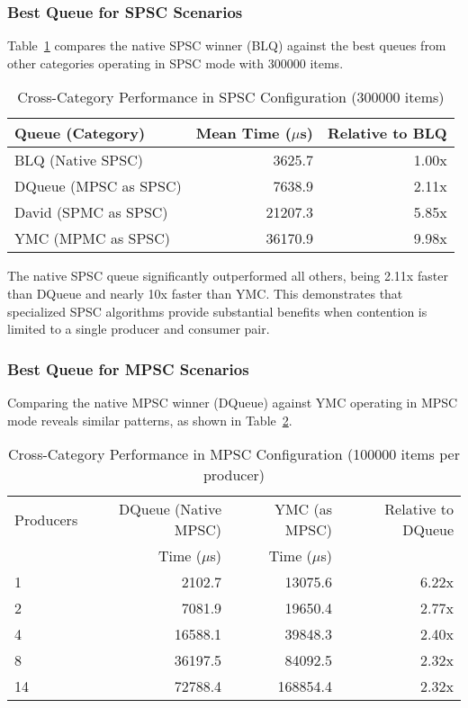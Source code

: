 \subsubsection{Best Queue for \ac{SPSC} Scenarios}
Table~\ref{tab:best-spsc} compares the native \ac{SPSC} winner (\ac{BLQ}) against the best queues from other categories operating in \ac{SPSC} mode with 300000 items.

\begin{table}[htb]
\centering
\caption{Cross-Category Performance in \ac{SPSC} Configuration (300000 items)}
\label{tab:best-spsc}
\begin{tabular}{@{}lrr@{}}
\toprule
Queue (Category) & Mean Time ($\mu$s) & Relative to \ac{BLQ} \\
\midrule
\ac{BLQ} (Native SPSC) & 3625.7 & 1.00x \\
DQueue (MPSC as SPSC) & 7638.9 & 2.11x \\
David (SPMC as SPSC) & 21207.3 & 5.85x \\
\ac{YMC} (MPMC as SPSC) & 36170.9 & 9.98x \\
\bottomrule
\end{tabular}
\end{table}

The native \ac{SPSC} queue significantly outperformed all others, being 2.11x faster than DQueue and nearly 10x faster than \ac{YMC}. This demonstrates that specialized \ac{SPSC} algorithms provide substantial benefits when contention is limited to a single producer and consumer pair.

\subsubsection{Best Queue for \ac{MPSC} Scenarios}
Comparing the native \ac{MPSC} winner (DQueue) against \ac{YMC} operating in \ac{MPSC} mode reveals similar patterns, as shown in Table~\ref{tab:best-mpsc}.

\begin{table}[htb]
\centering
\caption{Cross-Category Performance in \ac{MPSC} Configuration (100000 items per producer)}
\label{tab:best-mpsc}
\begin{tabular}{@{}lrrr@{}}
\toprule
Producers & DQueue (Native \ac{MPSC}) & \ac{YMC} (as \ac{MPSC}) & Relative to DQueue \\
& Time ($\mu$s) & Time ($\mu$s) & \\
\midrule
1 & 2102.7 & 13075.6 & 6.22x \\
2 & 7081.9 & 19650.4 & 2.77x \\
4 & 16588.1 & 39848.3 & 2.40x \\
8 & 36197.5 & 84092.5 & 2.32x \\
14 & 72788.4 & 168854.4 & 2.32x \\
\bottomrule
\end{tabular}
\end{table}

